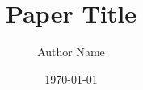\title{Paper Title}
\author{Author Name}
\date{\today}

\newcommand{\PaperAbstract}{%
Replace this text with a concise statement of the problem, method, principal
result, and contribution.}

\newif\ifshowglossary
\showglossaryfalse
\newif\ifshowbibliography
\showbibliographytrue
